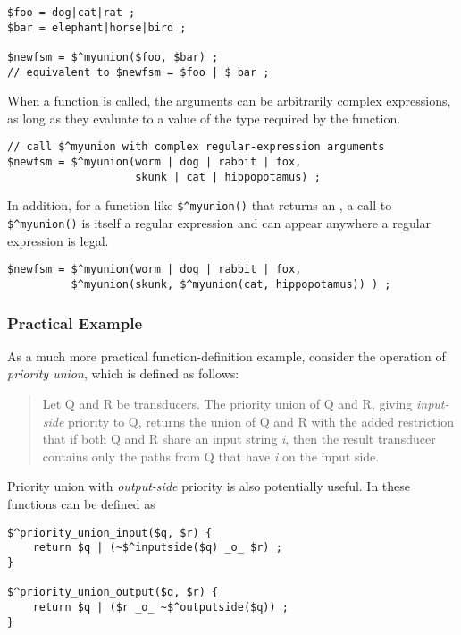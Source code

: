 \begin{Verbatim}
$foo = dog|cat|rat ;
$bar = elephant|horse|bird ;

$newfsm = $^myunion($foo, $bar) ;
// equivalent to $newfsm = $foo | $ bar ;
\end{Verbatim}

\noindent
When a function is called, the arguments can be arbitrarily complex expressions, as long as they evaluate to a
value of the type required by the function.

\begin{Verbatim}
// call $^myunion with complex regular-expression arguments
$newfsm = $^myunion(worm | dog | rabbit | fox, 
                    skunk | cat | hippopotamus) ;
\end{Verbatim}

\noindent
In addition, for a function like \verb!$^myunion()! that returns an \fsm{}, a call to \verb!$^myunion()! is
itself a regular expression and can appear anywhere a regular expression is legal.

\begin{Verbatim}
$newfsm = $^myunion(worm | dog | rabbit | fox, 
          $^myunion(skunk, $^myunion(cat, hippopotamus)) ) ;
\end{Verbatim}

\subsubsection{Practical Example}

As a much more practical function-definition example, consider the operation of \emph{priority union}, which is defined as follows:

\begin{quotation}
Let Q and R be transducers.  The priority union of Q and
R, giving \emph{input-side} priority to Q, returns the union of Q and R
with the added 
restriction that if both Q and R share an input string \emph{i}, then
the result transducer contains only the paths from Q that have
\emph{i} on the
input side.
\end{quotation}

\noindent
Priority union with \emph{output-side} priority is also potentially useful.
In \Kleene{} these functions can be defined as

\begin{Verbatim}
$^priority_union_input($q, $r) {
	return $q | (~$^inputside($q) _o_ $r) ;
}

$^priority_union_output($q, $r) {
	return $q | ($r _o_ ~$^outputside($q)) ;
}
\end{Verbatim}

